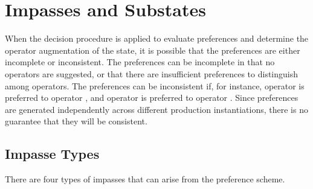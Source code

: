 \section{Impasses and Substates}
\label{ARCH-impasses}

When the decision procedure is applied to evaluate preferences and determine the operator augmentation of the state, it is possible that the preferences are either incomplete or inconsistent. 
The preferences can be incomplete in that no  operators are suggested, or that there are insufficient preferences to distinguish among  operators. 
The preferences can be inconsistent if, for instance, operator  is preferred to operator , and operator  is preferred to operator . Since preferences are generated independently across different production instantiations, there is no guarantee that they will be consistent.

\subsection{Impasse Types}
\label{ARCH-impasses-types}


There are four types of impasses that can arise from the preference scheme.
\vspace{-12pt}

